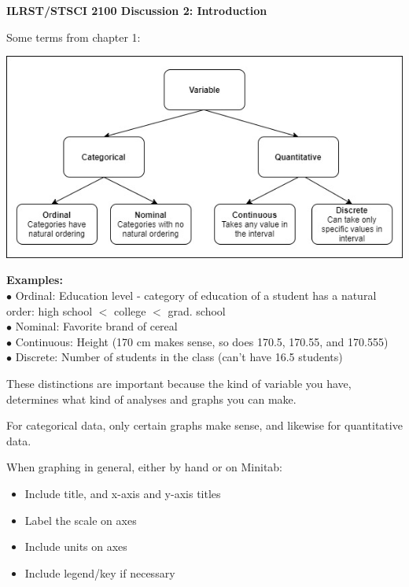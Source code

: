 \documentclass[12pt]{article}
\begin{document}
\begin{center}
\textbf{ILRST/STSCI 2100 Discussion 2: Introduction}
\end{center}

\noindent Some terms from chapter 1: \\
\vspace{-3mm}
\begin{center}
\includegraphics[scale = 0.5]{Disc1.jpg}
\end{center}

\noindent \textbf{Examples:} \\
\noindent $\bullet$ Ordinal: Education level - category of education of a student has a natural order: high school $<$ college $<$ grad. school  \\
\noindent $\bullet$ Nominal: Favorite brand of cereal \\
\noindent $\bullet$ Continuous: Height (170 cm makes sense, so does 170.5, 170.55, and 170.555) \\
\noindent $\bullet$ Discrete: Number of students in the class (can't have 16.5 students)

\noindent These distinctions are important because the kind of variable you have, determines what kind of analyses and graphs you can make.

\noindent For categorical data, only certain graphs make sense, and likewise for quantitative data.

\noindent When graphing in general, either by hand or on Minitab:
\begin{itemize}[noitemsep,nolistsep]
\item Include title, and x-axis and y-axis titles
\item Label the scale on axes
\item Include units on axes
\item Include legend/key if necessary
\end{itemize}
\end{document}
